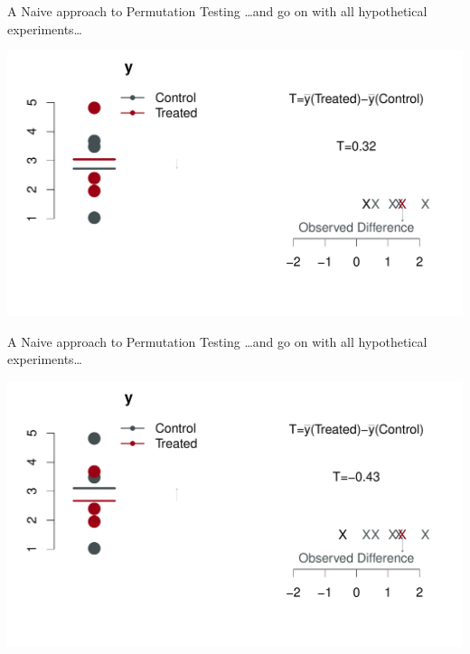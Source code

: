 \begin{frame}{A Naive approach to Permutation Testing}
\ldots and go on with all hypothetical experiments\ldots
\begin{center}
\includegraphics[width=1.1\textwidth]{figures/permsslides6} 
\end{center}
\end{frame}


\begin{frame}{A Naive approach to Permutation Testing}
\ldots and go on with all hypothetical experiments\ldots
\begin{center}
\includegraphics[width=1.1\textwidth]{figures/permsslides7} 
\end{center}
\end{frame}




